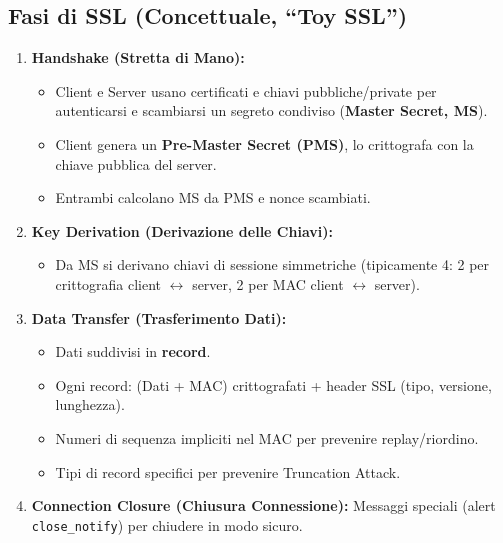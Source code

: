 \subsection{Fasi di SSL (Concettuale, \textquotedblleft Toy SSL\textquotedblright{})}
\begin{enumerate}
    \item \textbf{Handshake (Stretta di Mano):}
    \begin{itemize}
        \item Client e Server usano certificati e chiavi pubbliche/private per autenticarsi e scambiarsi un segreto condiviso (\textbf{Master Secret, MS}).
        \item Client genera un \textbf{Pre-Master Secret (PMS)}, lo crittografa con la chiave pubblica del server.
        \item Entrambi calcolano MS da PMS e nonce scambiati.
    \end{itemize}
    \item \textbf{Key Derivation (Derivazione delle Chiavi):}
    \begin{itemize}
        \item Da MS si derivano chiavi di sessione simmetriche (tipicamente 4: 2 per crittografia client $\leftrightarrow$ server, 2 per MAC client $\leftrightarrow$ server).
    \end{itemize}
    \item \textbf{Data Transfer (Trasferimento Dati):}
    \begin{itemize}
        \item Dati suddivisi in \textbf{record}.
        \item Ogni record: (Dati + MAC) crittografati + header SSL (tipo, versione, lunghezza).
        \item Numeri di sequenza impliciti nel MAC per prevenire replay/riordino.
        \item Tipi di record specifici per prevenire Truncation Attack.
    \end{itemize}
    \item \textbf{Connection Closure (Chiusura Connessione):}
    Messaggi speciali (alert \texttt{close\_notify}) per chiudere in modo sicuro.
\end{enumerate}

